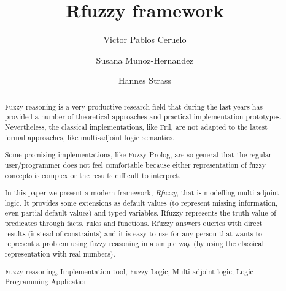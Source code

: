 \documentclass[runningheads,a4paper]{llncs}
\newcommand{\keywords}[1]{\par\addvspace\baselineskip
\noindent\keywordname\enspace\ignorespaces#1}
\begin{document}
\mainmatter  

\title{Rfuzzy framework}



\author{Victor Pablos Ceruelo \and Susana Munoz-Hernandez \and Hannes Strass}



\maketitle

\setcounter{page}{62}

\begin{abstract}
  Fuzzy reasoning is a very productive research field that during the
  last years has provided a number of theoretical approaches and
  practical implementation prototypes. Nevertheless, the classical
  implementations, like Fril, are not adapted to the latest formal
  approaches, like multi-adjoint logic semantics.

  Some promising implementations, like Fuzzy Prolog, are so general
  that the regular user/programmer does not feel comfortable because
  either representation of fuzzy concepts is complex or the results
  difficult to interpret.

  In this paper we present a modern framework, \emph{Rfuzzy}, that is
  modelling multi-adjoint logic. It provides some extensions as default
  values (to represent missing information, even partial default
  values) and typed variables. Rfuzzy represents the truth value of
  predicates through facts, rules and functions.  Rfuzzy answers
  queries with direct results (instead of constraints) and it is easy
  to use for any person that wants to represent a problem using fuzzy
  reasoning in a simple way (by using the classical representation
  with real numbers).

  \keywords{Fuzzy reasoning, Implementation tool, Fuzzy Logic, 
   Multi-adjoint logic, Logic Programming Application}
\end{abstract}
\end{document}
